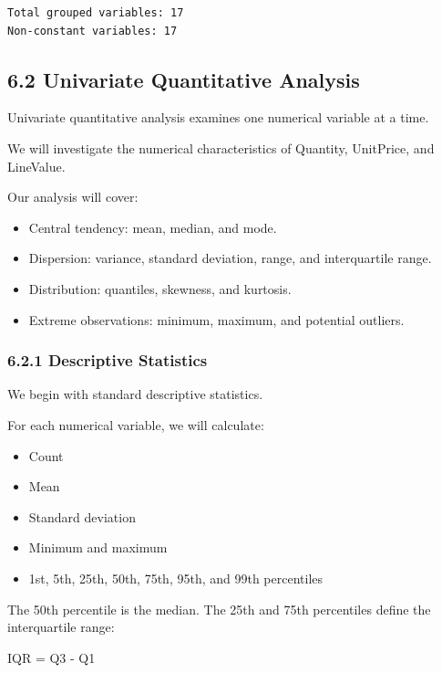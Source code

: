 \documentclass[11pt]{article}
\providecommand{\tightlist}{%
      \setlength{\itemsep}{0pt}\setlength{\parskip}{0pt}}
\begin{document}
    
    \begin{Verbatim}[commandchars=\\\{\}]
Total grouped variables: 17
Non-constant variables: 17
    \end{Verbatim}

    \subsection{6.2 Univariate Quantitative
Analysis}\label{univariate-quantitative-analysis}

Univariate quantitative analysis examines one numerical variable at a
time.

We will investigate the numerical characteristics of Quantity,
UnitPrice, and LineValue.

Our analysis will cover:

\begin{itemize}
\tightlist
\item
  Central tendency: mean, median, and mode.
\item
  Dispersion: variance, standard deviation, range, and interquartile
  range.
\item
  Distribution: quantiles, skewness, and kurtosis.
\item
  Extreme observations: minimum, maximum, and potential outliers.
\end{itemize}

    \subsubsection{6.2.1 Descriptive
Statistics}\label{descriptive-statistics}

We begin with standard descriptive statistics.

For each numerical variable, we will calculate:

\begin{itemize}
\tightlist
\item
  Count
\item
  Mean
\item
  Standard deviation
\item
  Minimum and maximum
\item
  1st, 5th, 25th, 50th, 75th, 95th, and 99th percentiles
\end{itemize}

The 50th percentile is the median. The 25th and 75th percentiles define
the interquartile range:

IQR = Q3 - Q1
\end{document}
